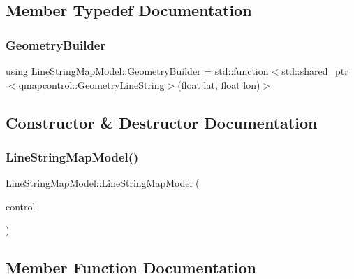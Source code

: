 \subsection{Member Typedef Documentation}
\mbox{\label{class_line_string_map_model_aca5f8e0c93dad8e39f8ec3aed0eee6a0}} 
\subsubsection{\texorpdfstring{GeometryBuilder}{GeometryBuilder}}
{\footnotesize\ttfamily using \mbox{\hyperlink{class_line_string_map_model_aca5f8e0c93dad8e39f8ec3aed0eee6a0}{Line\+String\+Map\+Model\+::\+Geometry\+Builder}} =  std\+::function$<$std\+::shared\+\_\+ptr$<$qmapcontrol\+::\+Geometry\+Line\+String$>$(float lat, float lon)$>$}



\subsection{Constructor \& Destructor Documentation}
\mbox{\label{class_line_string_map_model_a47f6a85ae566bef4971dd6da4ce9cc43}} 
\subsubsection{\texorpdfstring{LineStringMapModel()}{LineStringMapModel()}}
{\footnotesize\ttfamily Line\+String\+Map\+Model\+::\+Line\+String\+Map\+Model (\begin{DoxyParamCaption}\item[{qmapcontrol\+::\+Q\+Map\+Control $\ast$}]{control }\end{DoxyParamCaption})}



\subsection{Member Function Documentation}
\mbox{\label{class_line_string_map_model_ac4dae650b1e13b3517f134de4b90a3cf}} 
